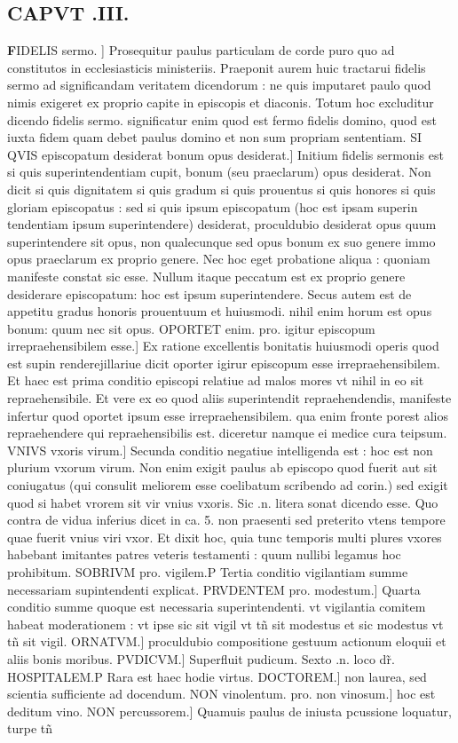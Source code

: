 \documentclass{article}
\begin{document}
\begin{pages}
\endnumbering\beginnumbering\section{CAPVT .III.}\pstart \huge\textbf{F}\normalsize IDELIS sermo. ] Prosequitur paulus particulam de corde puro  quo ad constitutos in ecclesiasticis ministeriis. Praeponit aurem huic tractarui fidelis sermo  ad significandam veritatem dicendorum : ne quis imputaret paulo quod nimis exigeret ex proprio capite in episcopis et diaconis. Totum hoc excluditur  dicendo fidelis sermo. significatur enim quod est fermo fidelis domino, quod est iuxta fidem quam debet paulus domino  et non sum propriam sententiam. SI QVIS episcopatum desiderat  bonum opus desiderat.] Initium fidelis sermonis est si quis superintendentiam cupit, bonum (seu praeclarum) opus desiderat. Non dicit si quis dignitatem  si quis gradum  si quis prouentus  si quis honores  si quis gloriam episcopatus : sed si quis ipsum episcopatum (hoc est ipsam superin tendentiam  ipsum superintendere) desiderat, proculdubio desiderat opus quum superintendere sit opus, non qualecunque  sed opus bonum ex suo genere  immo opus praeclarum ex proprio genere. Nec hoc eget probatione aliqua : quoniam manifeste constat sic esse. Nullum itaque  peccatum est ex proprio genere  desiderare episcopatum: hoc est ipsum superintendere. Secus autem est de appetitu gradus  honoris  prouentuum et huiusmodi. nihil enim horum est opus bonum: quum nec sit opus. OPORTET enim. pro. igitur  episcopum irrepraehensibilem esse.] Ex ratione excellentis bonitatis huiusmodi operis quod est supin renderejillariue dicit oporter igirur episcopum esse irrepraehensibilem. Et haec est prima conditio episcopi relatiue ad malos mores  vt nihil in eo sit repraehensibile. Et vere ex eo quod aliis superintendit repraehendendis, manifeste infertur quod oportet ipsum esse irrepraehensibilem. qua enim fronte porest alios repraehendere qui repraehensibilis est. diceretur namque  ei  medice cura teipsum. VNIVS vxoris virum.] Secunda conditio negatiue intelligenda est : hoc est non plurium vxorum virum. Non enim exigit paulus ab episcopo quod fuerit aut sit coniugatus (qui consulit meliorem esse coelibatum  scribendo ad corin.) sed exigit quod si habet vrorem sit vir vnius vxoris. Sic .n. litera sonat  dicendo esse. Quo contra de vidua inferius dicet in ca. 5. non praesenti sed preterito vtens tempore  quae fuerit vnius viri vxor. Et dixit hoc, quia tunc temporis multi plures vxores habebant  imitantes patres veteris testamenti : quum nullibi legamus hoc prohibitum. SOBRIVM pro. vigilem.P Tertia conditio vigilantiam summe necessariam supintendenti explicat. PRVDENTEM pro. modestum.] Quarta conditio summe quoque  est necessaria superintendenti. vt vigilantia comitem habeat moderationem : vt ipse sic sit vigil vt tñ sit modestus  et sic modestus vt tñ sit vigil. ORNATVM.] proculdubio compositione gestuum  actionum  eloquii  et aliis bonis moribus. PVDICVM.] Superfluit pudicum. Sexto .n. loco dr̃. HOSPITALEM.P Rara est haec hodie virtus. DOCTOREM.] non laurea, sed scientia sufficiente ad docendum. NON vinolentum. pro. non vinosum.] hoc est deditum vino. NON percussorem.] Quamuis paulus de iniusta pcussione loquatur, turpe tñ 
\end{pages}
\end{document}
